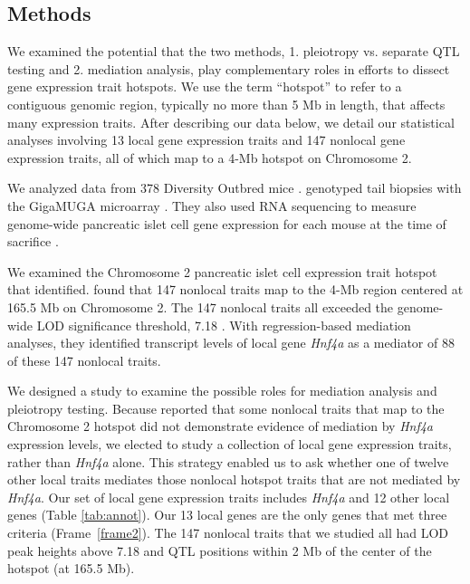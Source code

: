 \documentclass[oneside]{book}\usepackage[]{graphicx}\usepackage[]{color}
\begin{document}
\subsection{Methods}

We examined the potential that the two methods, 1. pleiotropy vs. separate QTL testing and 
2. mediation analysis, play complementary roles in efforts to dissect gene expression trait hotspots. 
We use the term ``hotspot'' to refer to a contiguous genomic region, 
typically no more than 5 Mb in length, that affects many expression traits.
After describing our data below, we detail our statistical analyses involving 13 local 
gene expression traits and 147 nonlocal gene expression traits, 
all of which map to a 4-Mb hotspot on Chromosome 2.


We analyzed data from 378 Diversity Outbred mice \citep{keller2018genetic}. 
\citet{keller2018genetic} genotyped tail biopsies with the GigaMUGA microarray \citep{morgan2015mouse}. 
They also used RNA sequencing to measure genome-wide pancreatic islet cell gene expression 
for each mouse at the time of sacrifice \citep{keller2018genetic}. 

We examined the Chromosome 2 pancreatic islet cell expression trait hotspot that \citet{keller2018genetic} identified. 
\citet{keller2018genetic} found that 147 nonlocal traits map to the 4-Mb region 
centered at 165.5 Mb on Chromosome 2.
The 147 nonlocal traits all exceeded the genome-wide LOD significance threshold, 
7.18 \citep{keller2018genetic}. 
With regression-based mediation analyses, they identified transcript levels of local gene \emph{Hnf4a} as a mediator of 88 of these 147 nonlocal traits.

We designed a study to examine the possible roles for mediation analysis and pleiotropy testing. 
Because \citet{keller2018genetic} reported that some nonlocal traits that map to 
the Chromosome 2 hotspot did not demonstrate evidence of mediation by \emph{Hnf4a} expression
levels, we elected to study a collection of local gene expression traits, 
rather than \emph{Hnf4a} alone.
This strategy enabled us to ask whether one of twelve other local traits mediates those 
nonlocal hotspot traits that are not mediated by \emph{Hnf4a}. 
Our set of local gene expression traits includes \emph{Hnf4a} and 12 
other local genes (Table \ref{tab:annot}). 
Our 13 local genes are the only genes that met three criteria (Frame~\ref{frame2}).
The 147 nonlocal traits that we studied all had LOD peak heights above 7.18 and QTL positions within 2 Mb of the center of the hotspot (at 165.5 Mb).
\end{document}
